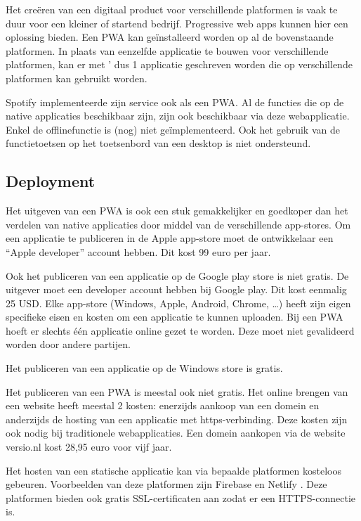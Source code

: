 	Het creëren van een digitaal product voor verschillende platformen is vaak te duur voor een kleiner of startend bedrijf. Progressive web apps kunnen hier een oplossing bieden. Een PWA kan geïnstalleerd worden op al de bovenstaande platformen. In plaats van eenzelfde applicatie te bouwen voor verschillende platformen, kan er met ' dus 1 applicatie geschreven worden die op verschillende platformen kan gebruikt worden.
	
	Spotify implementeerde zijn service ook als een PWA. \autocite{Spotify2020} Al de functies die op de native applicaties beschikbaar zijn, zijn ook beschikbaar via deze webapplicatie. Enkel de offlinefunctie is (nog) niet geïmplementeerd. Ook het gebruik van de functietoetsen op het toetsenbord van een desktop is niet ondersteund.
	
	\autocite{Vu2019}
	
	
\subsection{Deployment}

	Het uitgeven van een PWA is ook een stuk gemakkelijker en goedkoper dan het verdelen van native applicaties door middel van de verschillende app-stores. 
	Om een applicatie te publiceren in de Apple app-store moet de ontwikkelaar een “Apple developer” account hebben. Dit kost 99 euro per jaar. 
	\autocite{Apple2020b}
	
	Ook het publiceren van een applicatie op de Google play store is niet gratis. De uitgever moet een developer account hebben bij Google play. Dit kost eenmalig 25 USD.
	Elke app-store (Windows, Apple, Android, Chrome, …) heeft zijn eigen specifieke eisen en kosten om een applicatie te kunnen uploaden. Bij een PWA hoeft er slechts één applicatie online gezet te worden. Deze moet niet gevalideerd worden door andere partijen. 
	\autocite{GooglePlay2020}
	
	Het publiceren van een applicatie op de Windows store is gratis.
	
	Het publiceren van een PWA is meestal ook niet gratis. Het online brengen van een website heeft meestal 2 kosten: enerzijds aankoop van een domein en anderzijds de hosting van een applicatie met https-verbinding. Deze kosten zijn ook nodig bij traditionele webapplicaties.
	Een domein aankopen via de website versio.nl kost 28,95 euro voor vijf jaar.
	\autocite{Versio2020}
	
	Het hosten van een statische applicatie kan via bepaalde platformen kosteloos gebeuren. Voorbeelden van deze platformen zijn Firebase \autocite{Firebase2020} en Netlify \autocite{Netflify2020}. 	
	Deze platformen bieden ook gratis SSL-certificaten aan zodat er een HTTPS-connectie is. 
	
